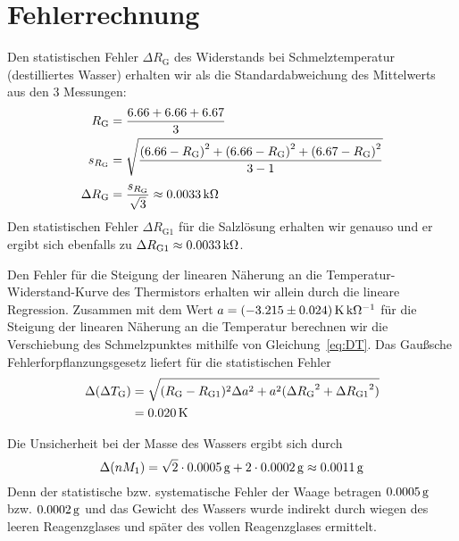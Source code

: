 \section{Fehlerrechnung}
\newcommand{\rg}{R_\mathrm{G}} %
\newcommand{\stat}{\Delta} %

Den statistischen Fehler $\Delta \rg$ des Widerstands bei Schmelztemperatur (destilliertes Wasser) erhalten wir als die Standardabweichung des Mittelwerts aus den 3 Messungen:
%
\begin{align*}
            \rg &= \frac{6.66 + 6.66 + 6.67}{3} \\
        s_{\rg} &= \sqrt{\frac{\left(6.66 - \rg\right)^2 + \left(6.66 - \rg\right)^2 + \left(6.67 - \rg\right)^2}{3 - 1}} \\[1mm]
    \stat \rg  &= \frac{s_{\rg}}{\sqrt{3}} \approx \unit[0.0033]{k\Omega}
\end{align*}
%
Den statistischen Fehler $\stat R_\mathrm{G1}$ für die Salzlösung erhalten wir genauso und er ergibt sich ebenfalls zu $\Delta R_\mathrm{G1} \approx \unit[0.0033]{k\Omega}$.

Den Fehler für die Steigung der linearen Näherung an die Temperatur-Widerstand-Kurve des Thermistors erhalten wir allein durch die lineare Regression.
%
Zusammen mit dem Wert $a = \unit[(-3.215 \pm 0.024)]{K\, k\Omega^{-1}}$ für die Steigung der linearen Näherung an die Temperatur berechnen wir die Verschiebung des Schmelzpunktes mithilfe von Gleichung~\ref{eq:DT}. Das Gaußsche Fehlerforpflanzungsgesetz liefert für die statistischen Fehler
%
\begin{align*}
    \stat(\Delta T_\mathrm{G}) &= \sqrt{(R_\mathrm{G} - R_\mathrm{G1})^2 \stat a^2 +
                                                      a^2 (\stat {R_\mathrm{G}}^2 + \stat {R_\mathrm{G1}}^2)} \\
                                              &= \unit[0.020]{K}
\end{align*}
%

Die Unsicherheit bei der Masse des Wassers ergibt sich durch
\[
    \stat(n M_1) = \sqrt{2} \cdot \unit[0.0005]{g} + 2 \cdot \unit[0.0002]{g} \approx \unit[0.0011]{g}
\]
Denn der statistische bzw. systematische Fehler der Waage betragen $\unit[0.0005]{g}$ bzw. $\unit[0.0002]{g}$ und das Gewicht des Wassers wurde indirekt durch wiegen des leeren Reagenzglases und später des vollen Reagenzglases ermittelt.

